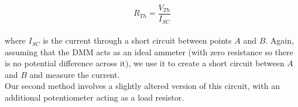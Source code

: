 \documentclass[11pt]{article}
\begin{document}
    \begin{equation}
        \label{eqn:thevenin}
        R_{Th} = \frac{V_{Th}}{I_{SC}}
    \end{equation} \\

    where \(I_{SC}\) is the current through a short circuit between points \(A\) and \(B\). Again, assuming that the DMM acts as an ideal ammeter (with zero resistance so there is no potential difference across it), we use it to create a short circuit between \(A\) and \(B\) and measure the current. \\

    Our second method involves a slightly altered version of this circuit, with an additional potentiometer acting as a load resistor. \\


\end{document}
